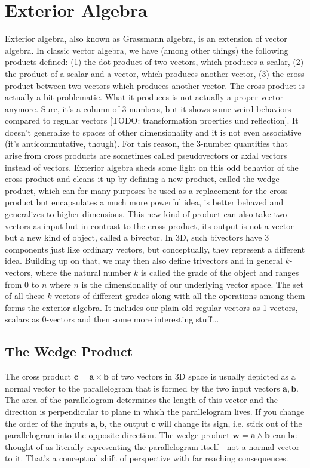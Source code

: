 \section{Exterior Algebra}
Exterior algebra, also known as Grassmann algebra, is an extension of vector algebra. In classic vector algebra, we have (among other things) the following products defined: (1) the dot product of two vectors, which produces a scalar, (2) the product of a scalar and a vector, which produces another vector, (3) the cross product between two vectors which produces another vector. The cross product is actually a bit problematic. What it produces is not actually a proper vector anymore. Sure, it's a column of 3 numbers, but it shows some weird behaviors compared to regular vectors [TODO: transformation proerties und reflection]. It doesn't generalize to spaces of other dimensionality and it is not even associative (it's anticommutative, though). For this reason, the 3-number quantities that arise from cross products are sometimes called pseudovectors or axial vectors instead of vectors. Exterior algebra sheds some light on this odd behavior of the cross product and cleans it up by defining a new product, called the wedge product, which can for many purposes be used as a replacement for the cross product but encapsulates a much more powerful idea, is better behaved and generalizes to higher dimensions. This new kind of product can also take two vectors as input but in contrast to the cross product, its output is not a vector but a new kind of object, called a bivector. In 3D, such bivectors have 3 components just like ordinary vectors, but conceptually, they represent a different idea. Building up on that, we may then also define trivectors and in general $k$-vectors, where the natural number $k$ is called the grade of the object and ranges from $0$ to $n$ where $n$ is the dimensionality of our underlying vector space. The set of all these $k$-vectors of different grades along with all the operations among them forms the exterior algebra. It includes our plain old regular vectors as 1-vectors, scalars as 0-vectors and then some more interesting stuff...

\subsection{The Wedge Product}
The cross product $\mathbf{c = a \times b}$ of two vectors in 3D space is usually depicted as a normal vector to the parallelogram that is formed by the two input vectors $\mathbf{a,b}$. The area of the parallelogram determines the length of this vector and the direction is perpendicular to plane in which the parallelogram lives. If you change the order of the inputs $\mathbf{a,b}$, the output  $\mathbf{c}$ will change its sign, i.e. stick out of the parallelogram into the opposite direction. The wedge product $\mathbf{w = a \wedge b}$ can be thought of as literally representing the parallelogram itself - not a normal vector to it. That's a conceptual shift of perspective with far reaching consequences. 

